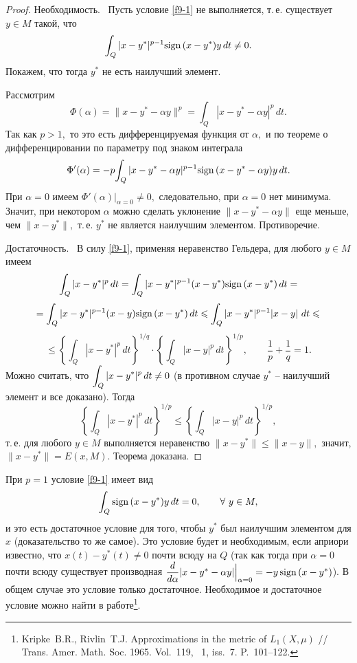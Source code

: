  \begin{proof} %
 Н\;е\;о\;б\;х\;о\;д\;и\;м\;о\;с\;т\;ь.~ Пусть условие \eqref{f9-1}
 не выполняется, т.\,е. существует $y\in M$ такой, что
 $$
 {\int_Q |x-y^*|^{p-1} {\rm sign \, } (x-y^*)y\, dt\ne 0.}
 $$
 Покажем, что тогда $y^*$ не есть наилучший элемент.

 Рассмотрим
 $$
 \Phi(\alpha)=\|x-y^*-\alpha y\|^p={\int_Q |x-y^*-\alpha y|^p\, dt.}
 $$
 Так как $p>1,$ то это есть дифференцируемая функция от $\alpha,$
 и по теореме о дифференцировании по параметру под
 знаком интеграла
 $$
 \Phi'(\alpha)=-p {\int_Q |x-y^*-\alpha y|^{p-1}{\rm sign \, }(x-y^*-\alpha y)y\, dt.}
 $$
 При $\alpha=0$ имеем $\Phi'(\alpha)|_{\alpha=0}\ne 0,$
 следовательно, при $\alpha=0$ нет минимума. Значит, при некотором
 $\alpha$ можно сделать уклонение $\|x-y^*-\alpha y\|$ еще меньше, чем
 $\|x-y^*\|,$ т.\,е. $y^*$ не является наилучшим элементом. Противоречие.

 Д\;о\;с\;т\;а\;т\;о\;ч\;н\;о\;с\;т\;ь.~ В силу \eqref{f9-1}, применяя неравенство
 Гельдера,  {для любого} {$y \in M$}
 имеем
 $$
 \int_Q |x-y^*|^{p}\, dt=\int_Q |x-y^*|^{p-1}(x-y^*){\rm sign \, }(x-y^*)\, dt=
 $$
 $$
 =\int_Q |x-y^*|^{p-1}(x-y){\rm sign \, }(x-y^*)\, dt \leqslant \int_Q |x-y^*|^{p-1}|x-y|\
 dt\leqslant
 $$
 $$
 \le \left\{ \int_Q |x-y^*|^{p}\, dt \right\}^{1/q}\cdot
 \left\{ \int_Q |x-y|^{p}\, dt \right\}^{1/p},\qquad
 {\frac{1}{p}+\frac{1}{q}=1}.
 $$
 Можно считать, что $\displaystyle\int_Q |x-y^*|^{p}\, dt\ne 0$ (в противном случае
 $y^*$ -- наилучший элемент и все доказано). Тогда
 $$
 \left\{ \int_Q |x-y^*|^{p}\, dt \right\}^{1/p}\le
 \left\{ \int_Q |x-y|^{p}\, dt \right\}^{1/p},
 $$
 т.\,е. для любого $y\in M$ выполняется неравенство $\|x-y^*\|\le \|x-y\|,$ значит,
 $\|x-y^*\|=E(x,M).$
 Теорема доказана.
 \end{proof}

 \begin{Remark} %
 При $p=1$ {условие} \eqref{f9-1} имеет вид
\begin{equation}\label{f9-2}
 \int_Q {\rm sign \, }(x-y^*)y\, dt=0,\qquad \forall\  y\in M,
\end{equation}
 и это есть достаточное условие для того, чтобы $y^*$
 был наилучшим элементом для $x$ (доказательство то же самое).
 Это условие будет и необходимым, если априори известно, что
 $x(t)-y^*(t)\ne 0$ почти всюду на $Q$ (так как тогда при $\alpha=0$ почти всюду существует
 производная $\dfrac{d}{d\alpha}|x-y^*-\alpha y|\Big|_{\alpha=0}=-y
 \, {\rm sign \, }(x-y^*)$). В общем случае это условие только
 достаточное. Необходимое и достаточное условие можно найти
 в работе\footnote{Kripke~B.R., Rivlin~T.J. Approximations in the metric of $L_1(X,\mu)$ //
 Trans. Amer. Math. Soc. 1965. Vol.~119, \No~1, iss.~7.
 P.~101--122.}.
 \end{Remark}

